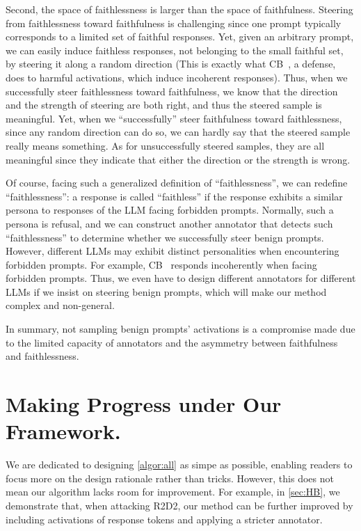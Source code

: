\documentclass{article}
\theoremstyle{plain}
\theoremstyle{definition}
\theoremstyle{remark}
\begin{document}
Second, the space of faithlessness is larger than the space of faithfulness. Steering from faithlessness toward faithfulness is challenging since one prompt typically corresponds to a limited set of faithful responses. Yet, given an arbitrary prompt, we can easily induce faithless responses, not belonging to the small faithful set, by steering it along a random direction (This is exactly what CB~\cite{circuitBreaker}, a defense, does to harmful activations, which induce incoherent responses). Thus, when we successfully steer faithlessness toward faithfulness, we know that the direction and the strength of steering are both right, and thus the steered sample is meaningful. Yet, when we ``successfully'' steer faithfulness toward faithlessness, since any random direction can do so, we can hardly say that the steered sample really means something. As for unsuccessfully steered samples, they are all meaningful since they indicate that either the direction or the strength is wrong.

Of course, facing such a generalized definition of ``faithlessness'', we can redefine ``faithlessness'': a response is called ``faithless'' if the response exhibits a similar persona to responses of the LLM facing forbidden prompts. Normally, such a persona is refusal, and we can construct another annotator that detects such ``faithlessness'' to determine whether we successfully steer benign prompts. However, different LLMs may exhibit distinct personalities when encountering forbidden prompts. For example, CB~\cite{circuitBreaker} responds incoherently when facing forbidden prompts. Thus, we even have to design different annotators for different LLMs if we insist on steering benign prompts, which will make our method complex and non-general.

In summary, not sampling benign prompts' activations is a compromise made due to the limited capacity of annotators and the asymmetry between faithfulness and faithlessness.



\section{Making Progress under Our Framework.}\label{sec:sota}

We are dedicated to designing \cref{algor:all} as simpe as possible, enabling readers to focus more on the design rationale rather than tricks. However, this does not mean our algorithm lacks room for improvement. For example, in \cref{sec:HB}, we demonstrate that, when attacking R2D2, our method can be further improved by including activations of response tokens and applying a stricter annotator.
\end{document}
